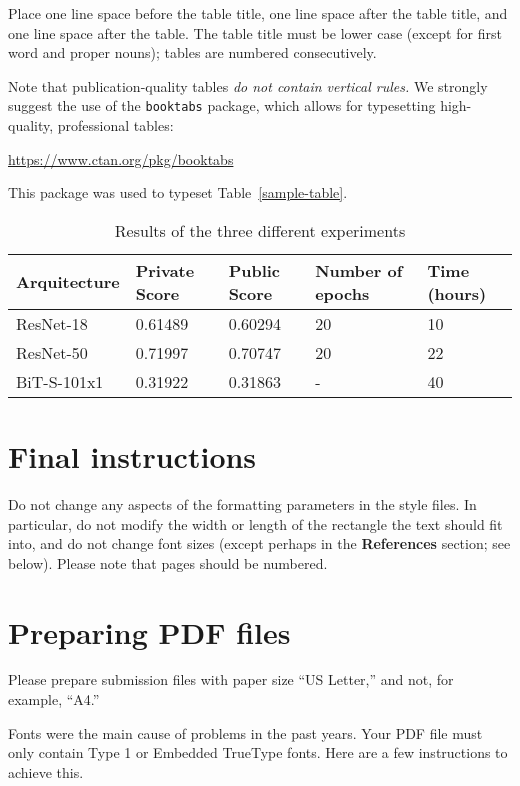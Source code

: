 \documentclass{article}
\begin{document}
Place one line space before the table title, one line space after the
table title, and one line space after the table. The table title must
be lower case (except for first word and proper nouns); tables are
numbered consecutively.

Note that publication-quality tables \emph{do not contain vertical rules.} We
strongly suggest the use of the \verb+booktabs+ package, which allows for
typesetting high-quality, professional tables:
\begin{center}
  \url{https://www.ctan.org/pkg/booktabs}
\end{center}
This package was used to typeset Table~\ref{sample-table}.

\begin{table}
  \caption{Results of the three different experiments}
  \label{results}
  \centering
  \begin{tabular}{lllll}
    \toprule
    Arquitecture     & Private Score    &Public Score     &   Number of epochs    & Time (hours)   \\
    \midrule
    ResNet-18 & 0.61489  &   0.60294  & 20    & 10 \\
    ResNet-50     & 0.71997 & 0.70747  & 20  & 22  \\
    BiT-S-101x1     & 0.31922  & 0.31863 & - & 40 \\
    \bottomrule
  \end{tabular}
\end{table}

\section{Final instructions}

Do not change any aspects of the formatting parameters in the style files.  In
particular, do not modify the width or length of the rectangle the text should
fit into, and do not change font sizes (except perhaps in the
\textbf{References} section; see below). Please note that pages should be
numbered.

\section{Preparing PDF files}

Please prepare submission files with paper size ``US Letter,'' and not, for
example, ``A4.''

Fonts were the main cause of problems in the past years. Your PDF file must only
contain Type 1 or Embedded TrueType fonts. Here are a few instructions to
achieve this.
\end{document}
